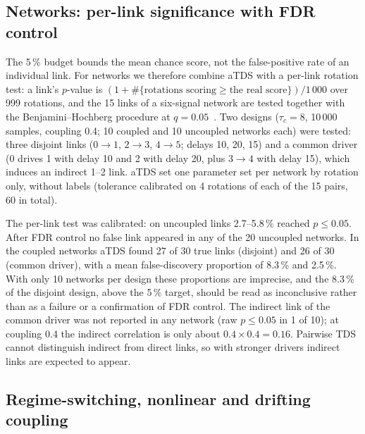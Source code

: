 \documentclass[11pt,a4paper]{article}
\begin{document}
\subsection{Networks: per-link significance with FDR control}
\label{sec:res-network}
The 5\,\% budget bounds the mean chance score, not the false-positive rate of an individual link. For networks we therefore combine aTDS with a per-link rotation test: a link's $p$-value is $(1 + \#\{\text{rotations scoring} \ge \text{the real score}\}) / 1\,000$ over 999 rotations, and the 15 links of a six-signal network are tested together with the Benjamini--Hochberg procedure at $q = 0.05$~\cite{Benjamini1995ControllingFalse}. Two designs ($\tau_c = 8$, 10\,000 samples, coupling 0.4; 10 coupled and 10 uncoupled networks each) were tested: three disjoint links ($0\to1$, $2\to3$, $4\to5$; delays 10, 20, 15) and a common driver (0 drives 1 with delay 10 and 2 with delay 20, plus $3\to4$ with delay 15), which induces an indirect 1--2 link. aTDS set one parameter set per network by rotation only, without labels (tolerance calibrated on 4 rotations of each of the 15 pairs, 60 in total).

The per-link test was calibrated: on uncoupled links 2.7--5.8\,\% reached $p \le 0.05$. After FDR control no false link appeared in any of the 20 uncoupled networks. In the coupled networks aTDS found 27 of 30 true links (disjoint) and 26 of 30 (common driver), with a mean false-discovery proportion of 8.3\,\% and 2.5\,\%. With only 10 networks per design these proportions are imprecise, and the 8.3\,\% of the disjoint design, above the 5\,\% target, should be read as inconclusive rather than as a failure or a confirmation of FDR control. The indirect link of the common driver was not reported in any network (raw $p \le 0.05$ in 1 of 10); at coupling 0.4 the indirect correlation is only about $0.4 \times 0.4 = 0.16$. Pairwise TDS cannot distinguish indirect from direct links, so with stronger drivers indirect links are expected to appear.

\subsection{Regime-switching, nonlinear and drifting coupling}
\label{sec:res-hard}
\end{document}
